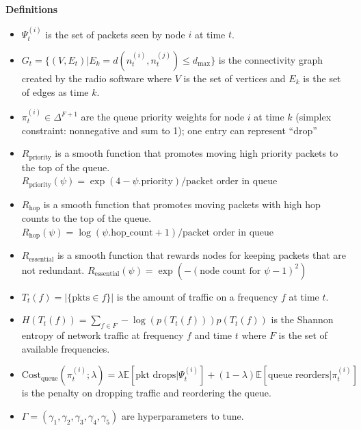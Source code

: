 \documentclass{article}
\begin{document}
\vspace{1 cm}


\textbf{Definitions}
\begin{itemize}
    \item $\Psi_{t}^{(i)}$ is the set of packets seen by node $i$ at time $t$.
    \item $G_{t} = \{ (V, E_{t}) | E_{k} = d(n_{t}^{(i)}, n_{t}^{(j)}) \le d_{\text{max}} \}$ is the connectivity graph created by the radio software where $V$ is the set of vertices and $E_{k}$ is the set of edges as time $k$.
    \item $\pi_{t}^{(i)}\in\Delta^{F+1}$ are the queue priority weights for node $i$ at time $k$ (simplex constraint: nonnegative and sum to 1); one entry can represent ``drop''
    \item $R_{\text{priority}}$ is a smooth function that promotes moving high priority packets to the top of the queue. $R_{\text{priority}}(\psi) = \exp( 4 - \psi.\text{priority}) / \text{packet order in queue}$


    \item $R_{\text{hop}}$ is a smooth function that promotes moving packets with high hop counts to the top of the queue. $R_{\text{hop}}(\psi) = \log(\psi.\text{hop\_count} + 1) / \text{packet order in queue}$

    \item $R_{\text{essential}}$ is a smooth function that rewards nodes for keeping packets that are not redundant. $R_{\text{essential}}(\psi) = \exp(- (\text{node count for }\psi - 1)^{2})$

    \item $T_{t}(f) = | \{ \text{pkts} \in f\} |$ is the amount of traffic on a frequency $f$ at time $t$.
    \item $H(T_{t}(f))= \sum _{f \in F} -\log(p(T_{t}(f))) p(T_{t}(f))$ is the Shannon entropy of network traffic at frequency $f$ and time $t$ where $F$ is the set of available frequencies.
    \item $\text{Cost}_{\text{queue}}(\pi_{t}^{(i)}; \lambda) = \lambda \mathbb{E}[\text{pkt drops}| \Psi_{t}^{(i)}] + (1 - \lambda) \mathbb{E}[\text{queue reorders}| \pi_{t}^{(i)}]$ is the penalty on dropping traffic and reordering the queue.
    \item $\Gamma = (\gamma_{1}, \gamma_{2}, \gamma_{3}, \gamma_{4}, \gamma_{5})$ are hyperparameters to tune.
\end{itemize}
\end{document}
